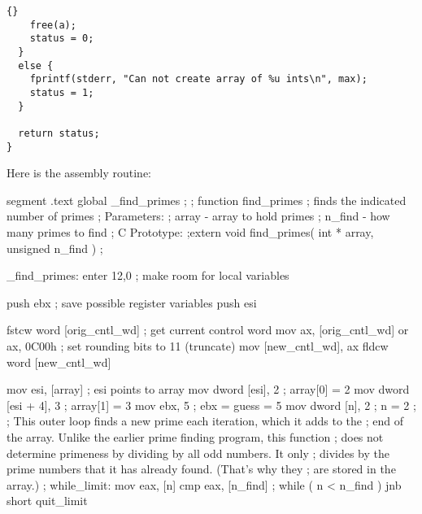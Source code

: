 {\begin{lstlisting}{}
    free(a);
    status = 0;
  }
  else {
    fprintf(stderr, "Can not create array of %u ints\n", max);
    status = 1;
  }

  return status;
}
\end{lstlisting}

Here is the assembly routine:


\begin{AsmCodeListing}[label=prime2.asm]
segment .text
        global  _find_primes
;
; function find_primes
; finds the indicated number of primes
; Parameters:
;   array  - array to hold primes
;   n_find - how many primes to find
; C Prototype:
;extern void find_primes( int * array, unsigned n_find )
;

_find_primes:
        enter   12,0                    ; make room for local variables

        push    ebx                     ; save possible register variables
        push    esi

        fstcw   word [orig_cntl_wd]     ; get current control word
        mov     ax, [orig_cntl_wd]
        or      ax, 0C00h               ; set rounding bits to 11 (truncate)
        mov     [new_cntl_wd], ax
        fldcw   word [new_cntl_wd]

        mov     esi, [array]            ; esi points to array
        mov     dword [esi], 2          ; array[0] = 2
        mov     dword [esi + 4], 3      ; array[1] = 3
        mov     ebx, 5                  ; ebx = guess = 5
        mov     dword [n], 2            ; n = 2
;
; This outer loop finds a new prime each iteration, which it adds to the
; end of the array. Unlike the earlier prime finding program, this function
; does not determine primeness by dividing by all odd numbers. It only
; divides by the prime numbers that it has already found. (That's why they
; are stored in the array.)
;
while_limit:
        mov     eax, [n]
        cmp     eax, [n_find]           ; while ( n < n_find )
        jnb     short quit_limit


\end{AsmCodeListing}}
